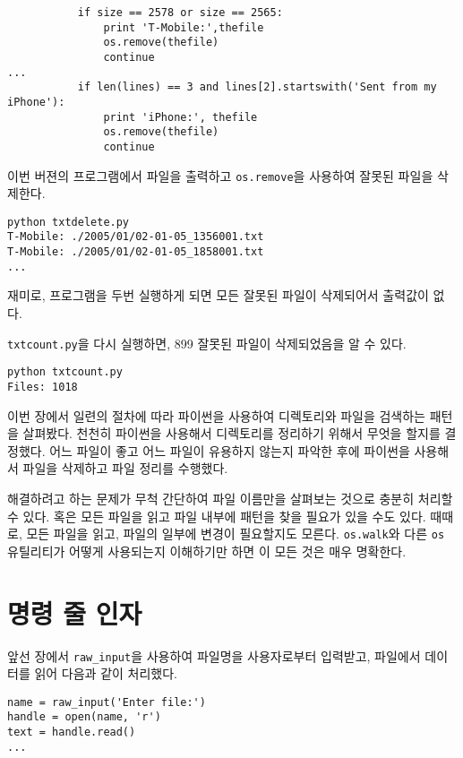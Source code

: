 \beforeverb
\begin{verbatim}
           if size == 2578 or size == 2565:
               print 'T-Mobile:',thefile
               os.remove(thefile)
               continue
...
           if len(lines) == 3 and lines[2].startswith('Sent from my iPhone'):
               print 'iPhone:', thefile
               os.remove(thefile)
               continue
\end{verbatim}
\afterverb
%

이번 버젼의 프로그램에서 파일을 출력하고 {\tt os.remove}을 사용하여 잘못된 파일을 삭제한다.

\beforeverb
\begin{verbatim}
python txtdelete.py 
T-Mobile: ./2005/01/02-01-05_1356001.txt
T-Mobile: ./2005/01/02-01-05_1858001.txt
...
\end{verbatim}
\afterverb
%

재미로, 프로그램을 두번 실행하게 되면 모든 잘못된 파일이 삭제되어서 출력값이 없다.

{\tt txtcount.py}을 다시 실행하면, 899 잘못된 파일이 삭제되었음을 알 수 있다.

\beforeverb
\begin{verbatim}
python txtcount.py 
Files: 1018
\end{verbatim}
\afterverb
%

이번 장에서 일련의 절차에 따라 파이썬을 사용하여 디렉토리와 파일을 검색하는 패턴을 살펴봤다.
천천히 파이썬을 사용해서 디렉토리를 정리하기 위해서 무엇을 할지를 결정했다.
어느 파일이 좋고 어느 파일이 유용하지 않는지 파악한 후에 파이썬을 사용해서 파일을 삭제하고 
파일 정리를 수행했다.

해결하려고 하는 문제가 무척 간단하여 파일 이름만을 살펴보는 것으로 충분히 처리할 수 있다. 
혹은 모든 파일을 읽고 파일 내부에 패턴을 찾을 필요가 있을 수도 있다.
때때로, 모든 파일을 읽고, 파일의 일부에 변경이 필요할지도 모른다. 
{\tt os.walk}와 다른 {\tt os} 유틸리티가 어떻게 사용되는지 이해하기만 하면 이 모든 것은 매우 명확한다.


\section{명령 줄 인자}


앞선 장에서 \verb"raw_input"을 사용하여 파일명을 사용자로부터 입력받고,
파일에서 데이터를 읽어 다음과 같이 처리했다.

\beforeverb
\begin{verbatim}
name = raw_input('Enter file:')
handle = open(name, 'r')
text = handle.read()
...
\end{verbatim}
\afterverb
%

